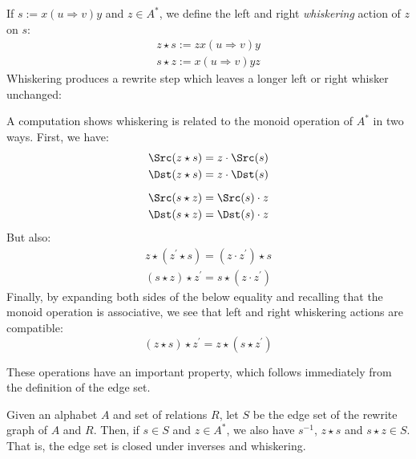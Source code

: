 \documentclass[../generics]{subfiles}
\begin{document}
\begin{definition}
If $s:=x(u\Rightarrow v)y$ and $z\in A^*$, we define the left and right \emph{whiskering} action of $z$ on $s$:\index{$\star$}
\begin{gather*}
z\star s := zx(u\Rightarrow v)y\\
s\star z := x(u\Rightarrow v)yz
\end{gather*}
Whiskering produces a rewrite step which leaves a longer left or right whisker unchanged:
\begin{quote}
\end{quote}
A computation shows whiskering is related to the monoid operation of $A^*$ in two ways. First, we have:
\begin{gather*}
\Src(z\star s)=z\cdot \Src(s)\\
\Dst(z\star s)=z\cdot \Dst(s)\\[\medskipamount]
\Src(s\star z)=\Src(s)\cdot z\\
\Dst(s\star z)=\Dst(s)\cdot z
\end{gather*}
But also:
\begin{gather*}
z\star (z^\prime \star s)=(z\cdot z^\prime) \star s\\
(s\star z)\star z^\prime=s\star (z\cdot z^\prime)
\end{gather*}
Finally, by expanding both sides of the below equality and recalling that the monoid operation is associative, we see that left and right whiskering actions are compatible:
\[(z\star s)\star z^\prime = z\star(s\star z^\prime)\]
\end{definition}
These operations have an important property, which follows immediately from the definition of the edge set.
\begin{proposition}\label{edge set closed}
Given an alphabet $A$ and set of relations $R$, let $S$ be the edge set of the rewrite graph of $A$ and $R$. Then, if $s\in S$ and $z\in A^*$, we also have $s^{-1}$, $z\star s$ and $s\star z\in S$. That is, the edge set is closed under inverses and whiskering.
\end{proposition}
\end{document}
